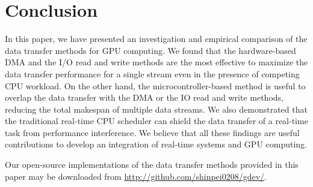 \section{Conclusion}
\label{sec:conclusion}

In this paper, we have presented an investigation and empirical
comparison of the data transfer methods for GPU computing.
We found that the hardware-based DMA and the I/O read and write methods
are the most effective to maximize the data transfer performance for a
single stream even in the presence of competing CPU workload.
On the other hand, the microcontroller-based method is useful to overlap
the data transfer with the DMA or the IO read and write methods,
reducing the total makespan of multiple data streams.
We also demonstrated that the traditional real-time CPU scheduler can
shield the data transfer of a real-time task from performance
interference.
We believe that all these findings are useful contributions to develop
an integration of real-time systems and GPU computing.

Our open-source implementations of the data transfer methods
provided in this paper may be downloaded from
\url{http://github.com/shinpei0208/gdev/}.